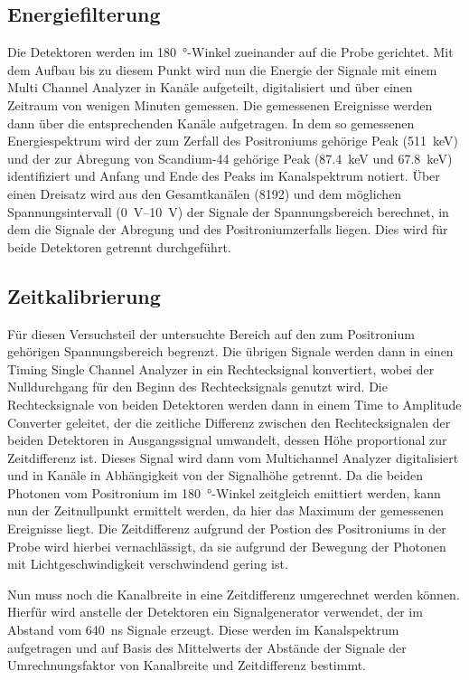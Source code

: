 \documentclass[
	a4paper,
	12pt,
	pagesize,
	ngerman
]{scrartcl}
\begin{document}
	\subsection{Energiefilterung}

	Die Detektoren werden im \SI{180}{\degree}-Winkel zueinander auf die Probe gerichtet.
	Mit dem Aufbau bis zu diesem Punkt wird nun die Energie der Signale mit einem Multi Channel Analyzer in Kanäle aufgeteilt, digitalisiert und über einen Zeitraum von wenigen Minuten gemessen. %
	Die gemessenen Ereignisse werden dann über die entsprechenden Kanäle aufgetragen.
	In dem so gemessenen Energiespektrum wird der zum Zerfall des Positroniums gehörige Peak (\SI{511}{keV}) und der zur Abregung von Scandium-44 gehörige Peak (\SI{87,4}{keV} und \SI{67,8}{keV}) identifiziert und Anfang und Ende des Peaks im Kanalspektrum notiert.
	Über einen Dreisatz wird aus den Gesamtkanälen (8192) und dem möglichen Spannungsintervall (\SIrange{0}{10}{\volt}) der Signale der Spannungsbereich berechnet, in dem die Signale der Abregung und des Positroniumzerfalls liegen.
	Dies wird für beide Detektoren getrennt durchgeführt.

	\subsection{Zeitkalibrierung}
	Für diesen Versuchsteil der untersuchte Bereich auf den zum Positronium gehörigen Spannungsbereich begrenzt.
  Die übrigen Signale werden dann in einen Timing Single Channel Analyzer in ein Rechtecksignal konvertiert, wobei der Nulldurchgang für den Beginn des Rechtecksignals genutzt wird.
	Die Rechtecksignale von beiden Detektoren werden dann in einem Time to Amplitude Converter geleitet, der die zeitliche Differenz zwischen den Rechtecksignalen der beiden Detektoren in Ausgangssignal umwandelt, dessen Höhe proportional zur Zeitdifferenz ist.
	Dieses Signal wird dann vom Multichannel Analyzer digitalisiert und in Kanäle in Abhängigkeit von der Signalhöhe getrennt.
	Da die beiden Photonen vom Positronium im \SI{180}{\degree}-Winkel zeitgleich emittiert werden, kann nun der Zeitnullpunkt ermittelt werden, da hier das Maximum der gemessenen Ereignisse liegt.
	Die Zeitdifferenz aufgrund der Postion des Positroniums in der Probe wird hierbei vernachlässigt, da sie aufgrund der Bewegung der Photonen mit Lichtgeschwindigkeit verschwindend gering ist.

	Nun muss noch die Kanalbreite in eine Zeitdifferenz umgerechnet werden können.
	Hierfür wird anstelle der Detektoren ein Signalgenerator verwendet, der im Abstand vom \SI{640}{\nano \second} Signale erzeugt.
	Diese werden im Kanalspektrum aufgetragen und auf Basis des Mittelwerts der Abstände der Signale der Umrechnungsfaktor von Kanalbreite und Zeitdifferenz bestimmt.
\end{document}
